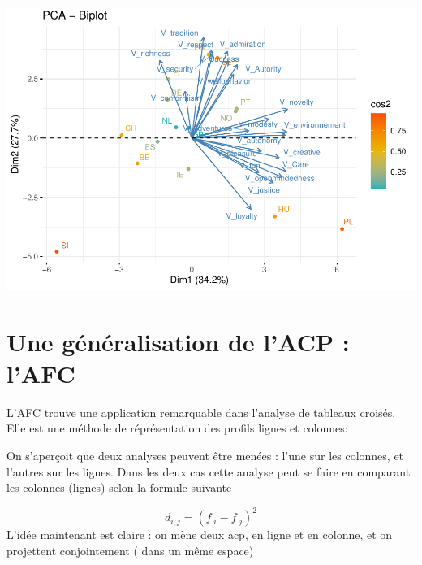\documentclass[
]{book}
\newenvironment{Shaded}{\begin{snugshade}}{\end{snugshade}}
\newcommand{\CommentTok}[1]{\textcolor[rgb]{0.56,0.35,0.01}{\textit{#1}}}
\newcommand{\DataTypeTok}[1]{\textcolor[rgb]{0.13,0.29,0.53}{#1}}
\newcommand{\DecValTok}[1]{\textcolor[rgb]{0.00,0.00,0.81}{#1}}
\newcommand{\KeywordTok}[1]{\textcolor[rgb]{0.13,0.29,0.53}{\textbf{#1}}}
\newcommand{\NormalTok}[1]{#1}
\newcommand{\OtherTok}[1]{\textcolor[rgb]{0.56,0.35,0.01}{#1}}
\newcommand{\StringTok}[1]{\textcolor[rgb]{0.31,0.60,0.02}{#1}}
\begin{document}
\begin{Shaded}
\end{Shaded}

\includegraphics{bookdown-demo_files/figure-latex/0609-4.pdf}

\hypertarget{une-guxe9nuxe9ralisation-de-lacp-lafc}{%
\section{Une généralisation de l'ACP : l'AFC}\label{une-guxe9nuxe9ralisation-de-lacp-lafc}}

L'AFC trouve une application remarquable dans l'analyse de tableaux croisés. Elle est une méthode de réprésentation des profils lignes et colonnes:

On s'aperçoit que deux analyses peuvent être menées : l'une sur les colonnes, et l'autres sur les lignes. Dans les deux cas cette analyse peut se faire en comparant les colonnes (lignes) selon la formule suivante

\[
d_{i,j}= (f_{.i}-f_{.j})^2
\]
L'idée maintenant est claire : on mène deux acp, en ligne et en colonne, et on projettent conjointement ( dans un même espace)
\end{document}

